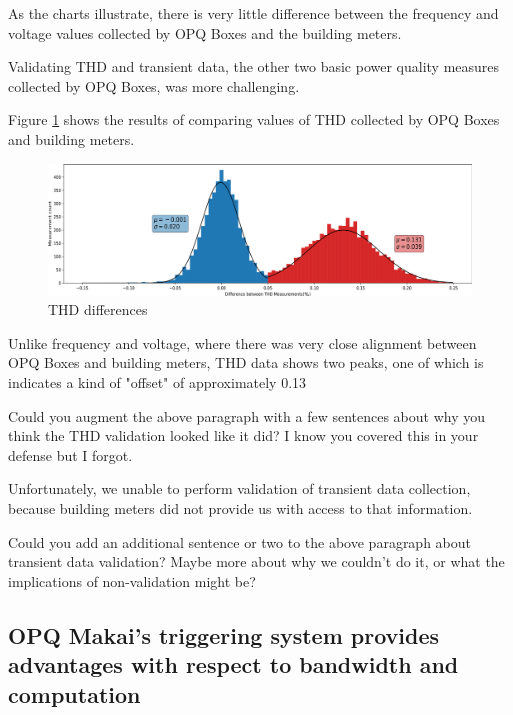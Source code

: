 As the charts illustrate, there is very little difference between the frequency and voltage values collected by OPQ Boxes and the building meters.

Validating THD and transient data, the other two basic power quality measures collected by OPQ Boxes, was more challenging.

Figure \ref{fig:opqbox-thd-validation} shows the results of comparing values of THD collected by OPQ Boxes and building meters.

\begin{figure}[ht]
  \centering
	\includegraphics[width=0.8\linewidth]{images/pilot/opqbox-thd-validation.png}
	\caption{THD differences}
	\label{fig:opqbox-thd-validation}
\end{figure}

Unlike frequency and voltage, where there was very close alignment between OPQ Boxes and building meters, THD data shows two peaks, one of which is indicates a kind of "offset" of approximately 0.13%

\begin{tcolorbox}[colback=blue!5!white,colframe=blue!75!black,title=SERGE]
Could you augment the above paragraph with a few sentences about why you think the THD validation looked like it did? I know you covered this in your defense but I forgot.
\end{tcolorbox}

Unfortunately, we unable to perform validation of transient data collection, because building meters did not provide us with access to that information.

\begin{tcolorbox}[colback=blue!5!white,colframe=blue!75!black,title=SERGE]
Could you add an additional sentence or two to the above paragraph about transient data validation? Maybe more about why we couldn't do it, or what the implications of non-validation might be?
\end{tcolorbox}

\subsection{OPQ Makai's triggering system provides advantages with respect to bandwidth and computation}

